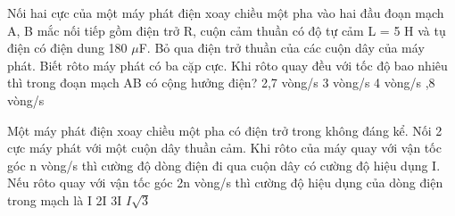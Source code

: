 \begin{vidu} %
	Nối hai cực của một máy phát điện xoay chiều một pha vào hai đầu đoạn mạch A, B mắc nối tiếp gồm điện trở R, cuộn cảm thuần có độ tự cảm L = 5 H và tụ điện có điện dung 180 $\mu$F. Bỏ qua điện trở thuần của các cuộn dây của máy phát. Biết rôto máy phát có ba cặp cực. Khi rôto quay đều với tốc độ bao nhiêu thì trong đoạn mạch AB có cộng hưởng điện?
	\choice
	{2,7 vòng/s}
	{3 vòng/s}
	{4 vòng/s}
	{,8 vòng/s}
\end{vidu}
\begin{vidu} %
	Một máy phát điện xoay chiều một pha có điện trở trong không đáng kể. Nối 2 cực máy phát với một cuộn dây thuần cảm. Khi rôto của máy quay với vận tốc góc n vòng/s thì cường độ dòng điện đi qua cuộn dây có cường độ hiệu dụng I. Nếu rôto quay với vận tốc góc 2n vòng/s thì cường độ hiệu dụng của dòng điện trong mạch là
	\choice
	{\True I}
	{2I}
	{3I}
	{$I\sqrt{3}$}
\end{vidu}
